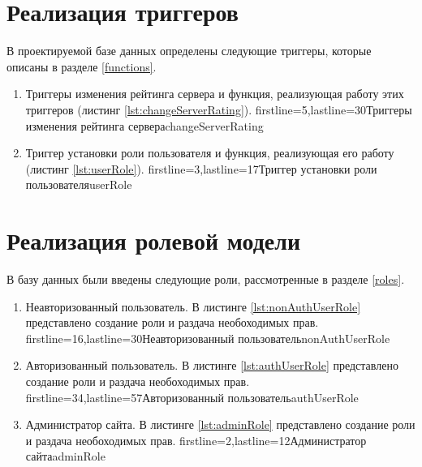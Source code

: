 \section{Реализация триггеров}

В проектируемой базе данных определены следующие триггеры, которые описаны в разделе \ref{functions}.

\begin{enumerate}
    \item Триггеры изменения рейтинга сервера и функция, реализующая работу этих триггеров (листинг \ref{lst:changeServerRating}).
            {firstline=5,lastline=30}{Триггеры изменения рейтинга сервера}{changeServerRating}{}

    \item Триггер установки роли пользователя и функция, реализующая его работу (листинг \ref{lst:userRole}).
            {firstline=3,lastline=17}{Триггер установки роли пользователя}{userRole}{}
\end{enumerate}


\section{Реализация ролевой модели}

В базу данных были введены следующие роли, рассмотренные в разделе \ref{roles}.

\begin{enumerate}
    \item Неавторизованный пользователь. В листинге \ref{lst:nonAuthUserRole} представлено создание роли и раздача необоходимых прав.
            {firstline=16,lastline=30}{Неавторизованный пользователь}{nonAuthUserRole}{}

    \item Авторизованный пользователь. В листинге \ref{lst:authUserRole} представлено создание роли и раздача необоходимых прав.
            {firstline=34,lastline=57}{Авторизованный пользователь}{authUserRole}{}

    \item Администратор сайта. В листинге \ref{lst:adminRole} представлено создание роли и раздача необоходимых прав.
            {firstline=2,lastline=12}{Администратор сайта}{adminRole}{}
\end{enumerate}


